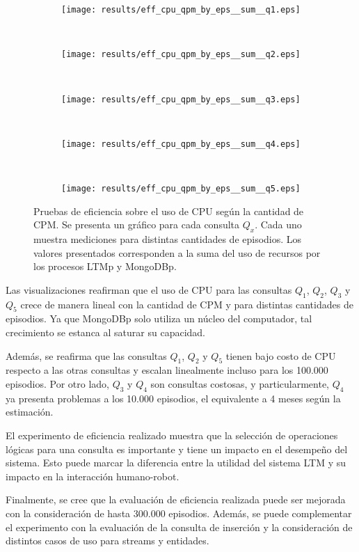 \begin{figure}[!ht]
	\centering
	\begin{subfigure}[b]{0.45\textwidth}
		\texttt{[image: results/eff\_cpu\_qpm\_by\_eps\_\_sum\_\_q1.eps]}
		\caption{}
		\label{result:eff_cpu_qpm_by_eps__sum__q1}
	\end{subfigure}
	~
	\begin{subfigure}[b]{0.45\textwidth}
		\texttt{[image: results/eff\_cpu\_qpm\_by\_eps\_\_sum\_\_q2.eps]}
		\caption{}
		\label{result:eff_cpu_qpm_by_eps__sum__q2}
	\end{subfigure}
	~
	\begin{subfigure}[b]{0.45\textwidth}
		\texttt{[image: results/eff\_cpu\_qpm\_by\_eps\_\_sum\_\_q3.eps]}
		\caption{}
		\label{result:eff_cpu_qpm_by_eps__sum__q3}
	\end{subfigure}
	~
	\begin{subfigure}[b]{0.45\textwidth}
		\texttt{[image: results/eff\_cpu\_qpm\_by\_eps\_\_sum\_\_q4.eps]}
		\caption{}
		\label{result:eff_cpu_qpm_by_eps__sum__q4}
	\end{subfigure}
	~
	\begin{subfigure}[b]{0.45\textwidth}
		\texttt{[image: results/eff\_cpu\_qpm\_by\_eps\_\_sum\_\_q5.eps]}
		\caption{}
		\label{result:eff_cpu_qpm_by_eps__sum__q5}
	\end{subfigure}
	\caption[Eficiencia: Uso de CPU según CPM para cada consulta de interés.]
	{\small Pruebas de eficiencia sobre el uso de CPU según la cantidad de CPM. Se presenta un gráfico para cada consulta $Q_x$. Cada uno muestra mediciones para distintas cantidades de episodios. Los valores presentados corresponden a la suma del uso de recursos por los procesos LTMp y MongoDBp.}
	\label{result:eff_cpu_qpm_by_eps__sum}
\end{figure}

Las visualizaciones reafirman que el uso de CPU para las consultas $Q_1$, $Q_2$, $Q_3$ y $Q_5$ crece de manera lineal con la cantidad de CPM y para distintas cantidades de episodios. Ya que MongoDBp solo utiliza un núcleo del computador, tal crecimiento se estanca al saturar su capacidad.

Además, se reafirma que las consultas $Q_1$, $Q_2$ y $Q_5$ tienen bajo costo de CPU respecto a las otras consultas y escalan linealmente incluso para los 100.000 episodios. Por otro lado, $Q_3$ y $Q_4$ son consultas costosas, y particularmente, $Q_4$ ya presenta problemas a los 10.000 episodios, el equivalente a 4 meses según la estimación.


El experimento de eficiencia realizado muestra que la selección de operaciones lógicas para una consulta es importante y tiene un impacto en el desempeño del sistema. Esto puede marcar la diferencia entre la utilidad del sistema LTM y su impacto en la interacción humano-robot. 

Finalmente, se cree que la evaluación de eficiencia realizada puede ser mejorada con la consideración de hasta 300.000 episodios. Además, se puede complementar el experimento con la evaluación de la consulta de inserción y la consideración de distintos casos de uso para streams y entidades.

